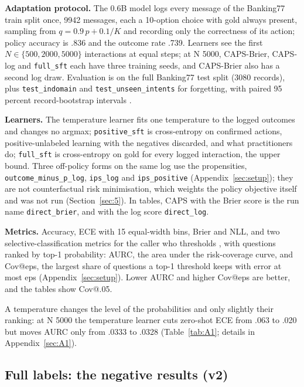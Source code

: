 \documentclass[10pt,letterpaper]{article}
\theoremstyle{plain}
\begin{document}
\textbf{Adaptation protocol.} The 0.6B model logs every message of the Banking77 train split once, 9942 messages, each a 10-option choice with gold always present, sampling from $q = 0.9\,p + 0.1/K$ and recording only the correctness of its action; policy accuracy is .836 and the outcome rate .739. Learners see the first $N \in \{500, 2000, 5000\}$ interactions at equal steps; at N 5000, CAPS-Brier, CAPS-log and \texttt{full\_sft} each have three training seeds, and CAPS-Brier also has a second log draw. Evaluation is on the full Banking77 test split (3080 records), plus \texttt{test\_indomain} and \texttt{test\_unseen\_intents} for forgetting, with paired 95 percent record-bootstrap intervals \citep{efron1979bootstrap,efron1993introduction}.

\textbf{Learners.} The temperature learner fits one temperature to the logged outcomes and changes no argmax; \texttt{positive\_sft} is cross-entropy on confirmed actions, positive-unlabeled learning with the negatives discarded, and what practitioners do; \texttt{full\_sft} is cross-entropy on gold for every logged interaction, the upper bound. Three off-policy forms on the same log use the propensities, \texttt{outcome\_minus\_p\_log}, \texttt{ips\_log} and \texttt{ips\_positive} (Appendix~\ref{sec:setup}); they are not counterfactual risk minimisation, which weights the policy objective itself and was not run (Section~\ref{sec:5}). In tables, CAPS with the Brier score is the run name \texttt{direct\_brier}, and with the log score \texttt{direct\_log}.

\textbf{Metrics.} Accuracy, ECE with 15 equal-width bins, Brier and NLL, and two selective-classification metrics for the caller who thresholds \citep{geifman2017selective}, with questions ranked by top-1 probability: AURC, the area under the risk-coverage curve, and Cov@eps, the largest share of questions a top-1 threshold keeps with error at most eps (Appendix~\ref{sec:setup}). Lower AURC and higher Cov@eps are better, and the tables show Cov@.05.

A temperature changes the level of the probabilities and only slightly their ranking: at N 5000 the temperature learner cuts zero-shot ECE from .063 to .020 but moves AURC only from .0333 to .0328 (Table~\ref{tab:A1}; details in Appendix~\ref{sec:A1}).

\subsection{Full labels: the negative results (v2)}\label{sec:4.2}
\end{document}
